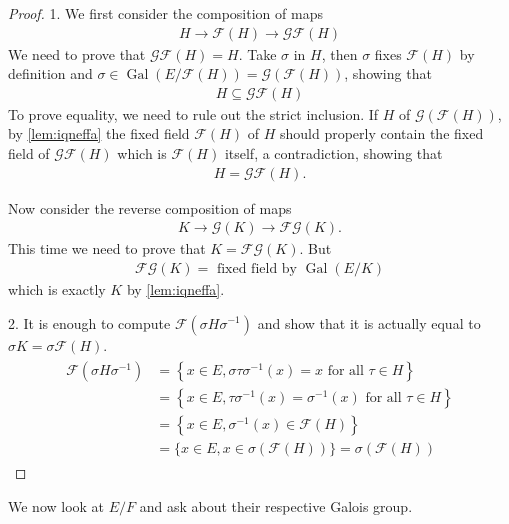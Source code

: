 \documentclass{article}
\begin{document}
\begin{proof}
1. We first consider the composition of maps
\begin{align*}
H \rightarrow \mathcal{F}(H) \rightarrow \mathcal{G} \mathcal{F}(H)
\end{align*}
We need to prove that $\mathcal{G} \mathcal{F}(H)=H$. Take $\sigma$ in $H$, then $\sigma$ fixes $\mathcal{F}(H)$ by definition and $\sigma \in \operatorname{Gal}(E / \mathcal{F}(H))=\mathcal{G}(\mathcal{F}(H))$, showing that
\begin{align*}
H \subseteq \mathcal{G F}(H)
\end{align*}
To prove equality, we need to rule out the strict inclusion. If $H$  of $\mathcal{G}(\mathcal{F}(H))$, by \cref{lem:iqneffa} the fixed field $\mathcal{F}(H)$ of $H$ should properly contain the fixed field of $\mathcal{G} \mathcal{F}(H)$ which is $\mathcal{F}(H)$ itself, a contradiction, showing that
\begin{align*}
H=\mathcal{G} \mathcal{F}(H) .
\end{align*}

Now consider the reverse composition of maps
\begin{align*}
K \rightarrow \mathcal{G}(K) \rightarrow \mathcal{F G}(K) .
\end{align*}
This time we need to prove that $K=\mathcal{F G}(K)$. But
\begin{align*}
\mathcal{F G}(K)=\text { fixed field by } \operatorname{Gal}(E / K)
\end{align*}
which is exactly $K$ by \cref{lem:iqneffa}.

2. It is enough to compute $\mathcal{F}\left(\sigma H \sigma^{-1}\right)$ and show that it is actually equal to $\sigma K=\sigma \mathcal{F}(H)$.
\begin{align*}
\begin{aligned}
\mathcal{F}\left(\sigma H \sigma^{-1}\right) &=\left\{x \in E, \sigma \tau \sigma^{-1}(x)=x \text { for all } \tau \in H\right\} \\
&=\left\{x \in E, \tau \sigma^{-1}(x)=\sigma^{-1}(x) \text { for all } \tau \in H\right\} \\
&=\left\{x \in E, \sigma^{-1}(x) \in \mathcal{F}(H)\right\} \\
&=\{x \in E, x \in \sigma(\mathcal{F}(H))\}=\sigma(\mathcal{F}(H))
\end{aligned}
\end{align*}
\end{proof} 
We now look at  $E / F$ and ask about their respective Galois group.
\end{document}
